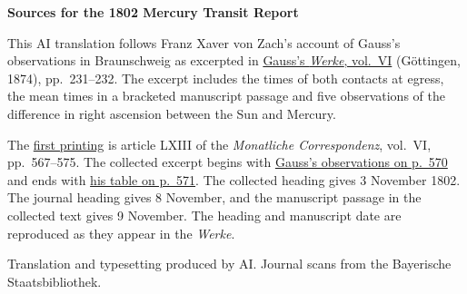 \clearpage\thispagestyle{empty}
\begin{center}\textbf{Sources for the 1802 Mercury Transit Report}\end{center}
\noindent This AI translation follows Franz Xaver von Zach’s account of Gauss’s observations in Braunschweig as excerpted in \href{https://gdz.sub.uni-goettingen.de/id/PPN236007467}{Gauss’s \textit{Werke}, vol.~VI} (Göttingen, 1874), pp.~231--232. The excerpt includes the times of both contacts at egress, the mean times in a bracketed manuscript passage and five observations of the difference in right ascension between the Sun and Mercury.
\par\smallskip\noindent The \href{https://api.digitale-sammlungen.de/iiif/image/v2/bsb10538598_00581/full/1450,/0/default.jpg}{first printing} is article LXIII of the \textit{Monatliche Correspondenz}, vol.~VI, pp.~567--575. The collected excerpt begins with \href{https://api.digitale-sammlungen.de/iiif/image/v2/bsb10538598_00584/full/1450,/0/default.jpg}{Gauss’s observations on p.~570} and ends with \href{https://api.digitale-sammlungen.de/iiif/image/v2/bsb10538598_00585/full/1450,/0/default.jpg}{his table on p.~571}. The collected heading gives 3 November 1802. The journal heading gives 8 November, and the manuscript passage in the collected text gives 9 November. The heading and manuscript date are reproduced as they appear in the \textit{Werke}.
\par\smallskip\noindent Translation and typesetting produced by AI. Journal scans from the Bayerische Staatsbibliothek.
\clearpage
